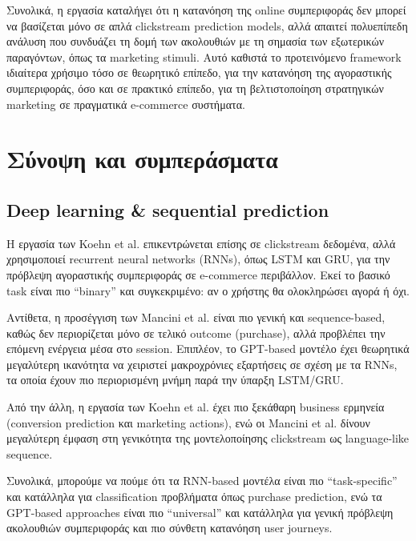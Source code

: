 \documentclass[12pt,a4paper]{article}
\begin{document}
	 Συνολικά, η εργασία καταλήγει ότι η κατανόηση της online συμπεριφοράς δεν μπορεί να βασίζεται μόνο σε απλά clickstream prediction models, αλλά απαιτεί πολυεπίπεδη ανάλυση που συνδυάζει τη δομή των ακολουθιών με τη σημασία των εξωτερικών παραγόντων, όπως τα marketing stimuli. Αυτό καθιστά το προτεινόμενο framework ιδιαίτερα χρήσιμο τόσο σε θεωρητικό επίπεδο, για την κατανόηση της αγοραστικής συμπεριφοράς, όσο και σε πρακτικό επίπεδο, για τη βελτιστοποίηση στρατηγικών marketing σε πραγματικά e-commerce συστήματα.
	 	
	\section{Σύνοψη και συμπεράσματα}
	\subsection{Deep learning \& sequential prediction}
	Η εργασία των Koehn et al. \cite{koehn2020predicting} επικεντρώνεται επίσης σε clickstream δεδομένα, αλλά χρησιμοποιεί recurrent neural networks (RNNs), όπως LSTM και GRU, για την πρόβλεψη αγοραστικής συμπεριφοράς σε e-commerce περιβάλλον. Εκεί το βασικό task είναι πιο “binary” και συγκεκριμένο: αν ο χρήστης θα ολοκληρώσει αγορά ή όχι.
	
	Αντίθετα, η προσέγγιση των Mancini et al. \cite{Mancini2025} είναι πιο γενική και sequence-based, καθώς δεν περιορίζεται μόνο σε τελικό outcome (purchase), αλλά προβλέπει την επόμενη ενέργεια μέσα στο session. Επιπλέον, το GPT-based μοντέλο έχει θεωρητικά μεγαλύτερη ικανότητα να χειριστεί μακροχρόνιες εξαρτήσεις σε σχέση με τα RNNs, τα οποία έχουν πιο περιορισμένη μνήμη παρά την ύπαρξη LSTM/GRU.
	
	Από την άλλη, η εργασία των Koehn et al.  \cite{koehn2020predicting} έχει πιο ξεκάθαρη business ερμηνεία (conversion prediction και marketing actions), ενώ οι Mancini et al. \cite{Mancini2025} δίνουν μεγαλύτερη έμφαση στη γενικότητα της μοντελοποίησης clickstream ως language-like sequence.
	
	Συνολικά, μπορούμε να πούμε ότι τα RNN-based μοντέλα είναι πιο “task-specific” και κατάλληλα για classification προβλήματα όπως purchase prediction, ενώ τα GPT-based approaches είναι πιο “universal” και κατάλληλα για γενική πρόβλεψη ακολουθιών συμπεριφοράς και πιο σύνθετη κατανόηση user journeys.
	
\end{document}
